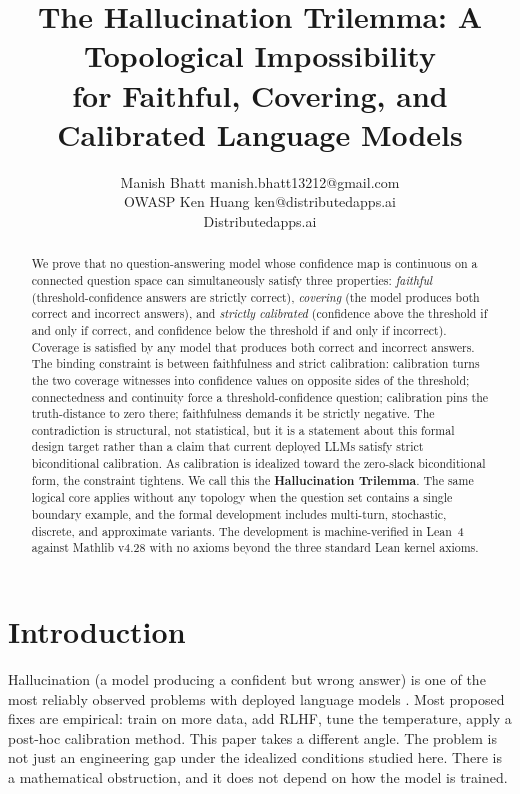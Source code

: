 \documentclass[10pt]{article}
\title{The Hallucination Trilemma: A Topological Impossibility\\
       for Faithful, Covering, and Calibrated Language Models}
\author{\name Manish Bhatt \email manish.bhatt13212@gmail.com \\
      \addr OWASP
      \AND
      \name Ken Huang \email ken@distributedapps.ai \\
      \addr Distributedapps.ai}
\begin{document}
\maketitle

\begin{abstract}
We prove that no question-answering model whose confidence map is
continuous on a connected question space can simultaneously satisfy three
properties: \emph{faithful} (threshold-confidence answers are strictly
correct), \emph{covering} (the model produces both correct and incorrect
answers), and \emph{strictly calibrated} (confidence above the threshold
if and only if correct, and confidence below the threshold if and only if
incorrect). Coverage is satisfied by any model that produces both correct
and incorrect answers. The binding constraint is between faithfulness and
strict calibration: calibration turns the two coverage witnesses into
confidence values on opposite sides of the threshold; connectedness and
continuity force a threshold-confidence question; calibration pins the
truth-distance to zero there; faithfulness demands it be strictly
negative. The contradiction is structural, not statistical, but it is a
statement about this formal design target rather than a claim that current
deployed LLMs satisfy strict biconditional calibration. As calibration is
idealized toward the zero-slack biconditional form, the constraint tightens.
We call this the \textbf{Hallucination Trilemma}. The same logical core
applies without any topology when the question set contains a single
boundary example, and the formal development includes multi-turn,
stochastic, discrete, and approximate variants. The development is
machine-verified in Lean~4 against Mathlib v4.28 with no axioms beyond
the three standard Lean kernel axioms.
\end{abstract}

\section{Introduction}
\label{sec:intro}

Hallucination (a model producing a confident but wrong answer) is one
of the most reliably observed problems with deployed language models
\citep{maynez2020faithfulness,ji2023survey,zhang2023siren}. Most proposed
fixes are empirical: train on more data, add RLHF, tune the temperature,
apply a post-hoc calibration method. This paper takes a different angle.
The problem is not just an engineering gap under the idealized conditions
studied here. There is a mathematical obstruction, and it does not depend
on how the model is trained.
\end{document}
